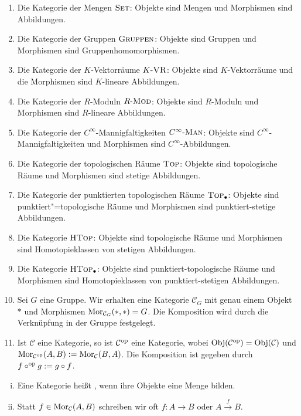 \begin{beispiel}[{name=[Kategorien]}]
	\leavevmode
	\begin{enumerate}[(1),itemsep=0pt]
		\item Die Kategorie der Mengen $\textsc{Set}$: Objekte sind Mengen und Morphismen sind Abbildungen.
		\item Die Kategorie der Gruppen $\textsc{Gruppen}$: Objekte sind Gruppen und Morphismen sind Gruppenhomomorphismen.
		\item Die Kategorie der $K$-Vektorräume $K\text{-}\textsc{VR}$: Objekte sind $K$-Vektorräume und die Morphismen sind $K$-lineare Abbildungen.
		\item Die Kategorie der $R$-Moduln $R\text{-}\textsc{Mod}$: Objekte sind $R$-Moduln und Morphismen sind $R$-lineare Abbildungen.
		\item Die Kategorie der $C^\infty$-Mannigfaltigkeiten $C^\infty\text{-}\textsc{Man}$: Objekte sind $C^\infty$-Mannigfaltigkeiten und Morphismen sind $C^\infty$-Abbildungen.
		\item Die Kategorie der topologischen Räume $\textsc{Top}$: Objekte sind topologische Räume und Morphismen sind stetige Abbildungen.
		\item Die Kategorie der punktierten topologischen Räume $\textsc{Top}_\bullet$: Objekte sind punktiert"=topologische Räume und Morphismen sind punktiert-stetige Abbildungen.
		\item Die Kategorie $\textsc{HTop}$: Objekte sind topologische Räume und Morphismen sind Homotopieklassen von stetigen Abbildungen.
		\item Die Kategorie $\textsc{HTop}_\bullet$: Objekte sind punktiert-topologische Räume und Morphismen sind Homotopieklassen von punktiert-stetigen Abbildungen.
		\item Sei $G$ eine Gruppe. Wir erhalten eine Kategorie $\mathcal{C}_G$ mit genau einem Objekt $*$ und Morphismen $\operatorname{Mor}_{\mathcal{C}_G}(*,*) = G$. Die Komposition wird durch die
		Verknüpfung in der Gruppe festgelegt.
		\item Ist $\mathcal{C}$ eine Kategorie, so ist $\mathcal{C}^{\mathrm{op}}$ eine Kategorie, wobei $\operatorname{Obj}(\mathcal{C}^{\mathrm{op}}) = \operatorname{Obj}(\mathcal{C})$ und 
		\(
			\operatorname{Mor}_{\mathcal{C}^{\mathrm{op}}}(A,B) := \operatorname{Mor}_\mathcal{C}(B,A)
		\).
		Die Komposition ist gegeben durch $f \circ^{\mathrm{op}} g := g \circ f$.
	\end{enumerate}
\end{beispiel}

\begin{bemerkung}[{name=[kleine Kategorie]}]
	\leavevmode
	\begin{enumerate}[(i)]
		\item Eine Kategorie heißt , wenn ihre Objekte eine Menge bilden.
		\item Statt $f \in \operatorname{Mor}_\mathcal{C}(A,B)$ schreiben wir oft $f \colon A \to B$ oder $A \xrightarrow{f} B$.
	\end{enumerate}
\end{bemerkung}

